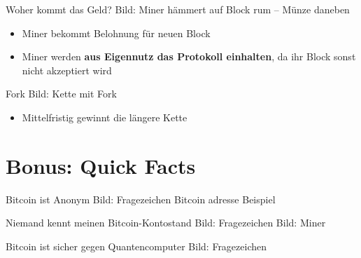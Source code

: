 \documentclass[aspectratio=169]{beamer}
\begin{document}
\begin{frame}{Woher kommt das Geld?}
    Bild: Miner hämmert auf Block rum -- Münze daneben
    \begin{itemize}
        \item Miner bekommt Belohnung für neuen Block
        \item Miner werden \textbf{aus Eigennutz das Protokoll einhalten}, da ihr Block sonst nicht akzeptiert wird
    \end{itemize}
\end{frame}


\begin{frame}{Fork}
    Bild: Kette mit Fork
    \begin{itemize}
        \item Mittelfristig gewinnt die längere Kette
    \end{itemize}
\end{frame}












\section{Bonus: Quick Facts}


\begin{frame}{Bitcoin ist Anonym}
    Bild: Fragezeichen
    \pause
    Bitcoin adresse Beispiel
\end{frame}


\begin{frame}{Niemand kennt meinen Bitcoin-Kontostand}
    Bild: Fragezeichen
    \pause
    Bild: Miner
\end{frame}


\begin{frame}{Bitcoin ist sicher gegen Quantencomputer}
    Bild: Fragezeichen
\end{frame}
\end{document}
